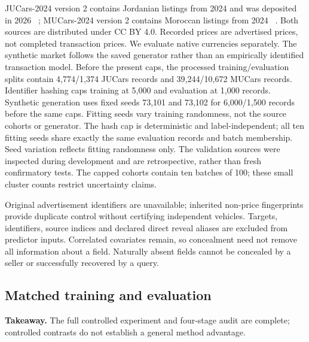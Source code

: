 \documentclass[11pt]{article}
\begin{document}
JUCars-2024 version 2 contains Jordanian listings from 2024 and was deposited
in 2026 ~\cite{jucarsdata}; MUCars-2024 version 2 contains Moroccan listings
from 2024 ~\cite{mucarsdata}. Both sources are distributed under CC BY 4.0.
Recorded prices are advertised prices, not completed transaction prices.
We evaluate native currencies separately. The synthetic market follows the
saved generator rather than an empirically identified transaction model.
Before the present caps, the processed training/evaluation splits contain
4,774/1,374 JUCars records and 39,244/10,672 MUCars records. Identifier hashing
caps training at 5,000 and evaluation at 1,000 records. Synthetic generation
uses fixed seeds 73,101 and 73,102 for 6,000/1,500 records before the same caps.
Fitting seeds vary training randomness, not the source cohorts or generator.
The hash cap is deterministic and label-independent; all ten fitting seeds share exactly the same evaluation records and batch membership. Seed variation reflects fitting randomness only. The validation sources were inspected during development and are retrospective, rather than fresh confirmatory tests. The capped cohorts contain ten batches of 100; these small cluster counts restrict uncertainty claims.

Original advertisement identifiers are unavailable; inherited non-price
fingerprints provide duplicate control without certifying independent vehicles.
Targets, identifiers, source indices and declared direct reveal aliases are
excluded from predictor inputs. Correlated covariates remain, so concealment
need not remove all information about a field. Naturally absent fields cannot
be concealed by a seller or successfully recovered by a query.

\subsection{Matched training and evaluation}
\noindent\textbf{Takeaway.} The full controlled experiment and four-stage audit are complete;
controlled contrasts do not establish a general method advantage.
\end{document}
